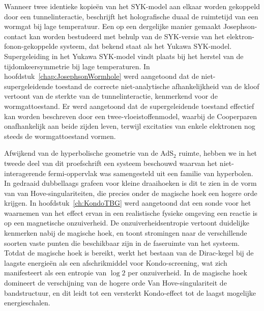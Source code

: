 Wanneer twee identieke kopieën van het SYK-model aan elkaar worden gekoppeld door een tunnelinteractie, beschrijft het holografische duaal de ruimtetijd van een wormgat bij lage temperatuur. Een op een dergelijke manier gemaakt Josephson-contact kan worden bestudeerd met behulp van de SYK-versie van het elektron-fonon-gekoppelde systeem, dat bekend staat als het Yukawa SYK-model. Supergeleiding in het Yukawa SYK-model vindt plaats bij het herstel van de tijdomkeersymmetrie bij lage temperaturen. In hoofdstuk~\ref{chap:JosephsonWormhole} werd aangetoond dat de niet-supergeleidende toestand de correcte niet-analytische afhankelijkheid van de kloof vertoont van de sterkte van de tunnelinteractie, kenmerkend voor de wormgattoestand. Er werd aangetoond dat de supergeleidende toestand effectief kan worden beschreven door een twee-vloeistoffenmodel, waarbij de Cooperparen onafhankelijk aan beide zijden leven, terwijl excitaties van enkele elektronen nog steeds de wormgattoestand vormen.
\par
Afwijkend van de hyperbolische geometrie van de AdS${}_2$ ruimte, hebben we in het tweede deel van dit proefschrift een systeem beschouwd waarvan het niet-interagerende fermi-oppervlak was samengesteld uit een familie van hyperbolen. In gedraaid dubbellaags grafeen voor kleine draaihoeken is dit te zien in de vorm van van Hove-singulariteiten, die precies onder de magische hoek een hogere orde krijgen. In hoofdstuk~\ref{ch:KondoTBG} werd aangetoond dat een sonde voor het waarnemen van het effect ervan in een realistische fysieke omgeving een reactie is op een magnetische onzuiverheid. De onzuiverheidsentropie vertoont duidelijke kenmerken nabij de magische hoek, en toont stromingen naar de verschillende soorten vaste punten die beschikbaar zijn in de faseruimte van het systeem. Totdat de magische hoek is bereikt, werkt het bestaan van de Dirac-kegel bij de laagste energieën als een afschrikmiddel voor Kondo-screening, wat zich manifesteert als een entropie van $\log 2$ per onzuiverheid. In de magische hoek domineert de verschijning van de hogere orde Van Hove-singulariteit de bandstructuur, en dit leidt tot een versterkt Kondo-effect tot de laagst mogelijke energieschalen.

\newpage
\thispagestyle{empty}